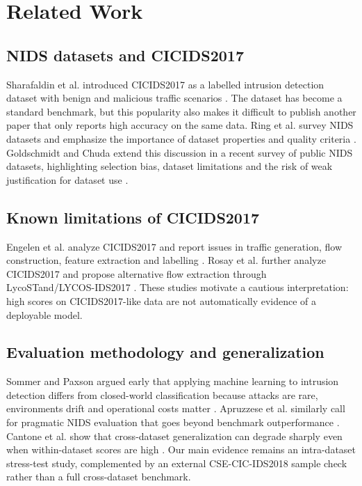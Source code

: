 \documentclass[11pt,a4paper]{article}
\begin{document}
\section{Related Work}

\subsection{NIDS datasets and CICIDS2017}

Sharafaldin et al. introduced CICIDS2017 as a labelled intrusion detection dataset with benign and malicious traffic scenarios \cite{sharafaldin2018cicids}. The dataset has become a standard benchmark, but this popularity also makes it difficult to publish another paper that only reports high accuracy on the same data. Ring et al. survey NIDS datasets and emphasize the importance of dataset properties and quality criteria \cite{ring2019survey}. Goldschmidt and Chuda extend this discussion in a recent survey of public NIDS datasets, highlighting selection bias, dataset limitations and the risk of weak justification for dataset use \cite{goldschmidt2025nidsdatasets}.

\subsection{Known limitations of CICIDS2017}

Engelen et al. analyze CICIDS2017 and report issues in traffic generation, flow construction, feature extraction and labelling \cite{engelen2021troubleshooting}. Rosay et al. further analyze CICIDS2017 and propose alternative flow extraction through LycoSTand/LYCOS-IDS2017 \cite{rosay2022cicidsanalysis}. These studies motivate a cautious interpretation: high scores on CICIDS2017-like data are not automatically evidence of a deployable model.

\subsection{Evaluation methodology and generalization}

Sommer and Paxson argued early that applying machine learning to intrusion detection differs from closed-world classification because attacks are rare, environments drift and operational costs matter \cite{sommer2010outside}. Apruzzese et al. similarly call for pragmatic NIDS evaluation that goes beyond benchmark outperformance \cite{apruzzese2023pragmatic}. Cantone et al. show that cross-dataset generalization can degrade sharply even when within-dataset scores are high \cite{cantone2024crossdataset}. Our main evidence remains an intra-dataset stress-test study, complemented by an external CSE-CIC-IDS2018 sample check rather than a full cross-dataset benchmark.
\end{document}
